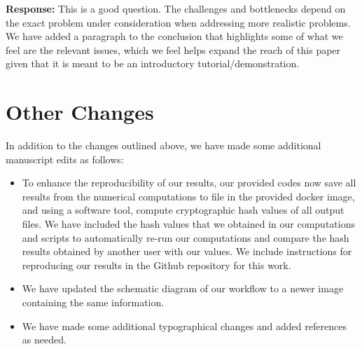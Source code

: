\documentclass{article}
\begin{document}
\begin{enumerate}
  \textbf{Response:} This is a good question. The challenges and
  bottlenecks depend on the exact problem under consideration when addressing
  more realistic problems. We have added a paragraph to the conclusion
  that highlights some of what we feel are the relevant issues, which
  we feel helps expand the reach of this paper given that it is meant
  to be an introductory tutorial/demonstration.
  
\end{enumerate}

\section{Other Changes}

In addition to the changes outlined above, we have made some additional
manuscript edits as follows:

\begin{itemize}

  \item To enhance the reproducibility of our results,
    our provided codes now save all results from the numerical computations
    to file in the provided docker image, and using a software tool,
    compute cryptographic hash values of all output files. We have included
    the hash values that we obtained in our computations and scripts to
    automatically re-run our computations and compare the hash results
    obtained by another user with our values. We include instructions
    for reproducing our results in the Github repository for this work.

  \item We have updated the schematic diagram of our workflow to a newer
    image containing the same information.

  \item We have made some additional typographical changes and added
    references as needed.

\end{itemize}
\end{document}
